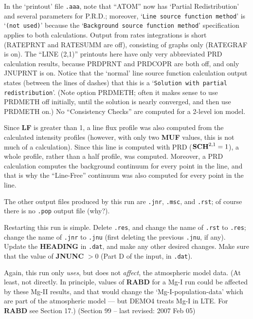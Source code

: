 In the `printout' file {\tt .aaa}, note that ``ATOM'' now has `Partial
Redistribution' and several parameters for P.R.D.; moreover,
`{\tt Line source function method}' is `{\tt (not used)}'
because the `{\tt Background source function method}' specification
applies to both calculations. Output from rates integrations is
short (RATEPRNT and RATESUMM are off), consisting of graphs only (RATEGRAF is
on). The ``LINE (2,1)'' printouts here have only very abbreviated PRD calculation
results, because PRDPRNT and PRDCOPR are both off, and only \break
JNUPRNT is on. Notice that the `normal' line source function calculation
output states (between the lines of dashes) that this is a `{\tt Solution with
partial redistribution}'. (Note option PRDMETH; often it makes sense to use
PRDMETH off initially, until the solution is nearly converged, and then
use PRDMETH on.) No ``Consistency Checks'' are computed
for a 2-level ion model. 

Since {\bf LF} is greater than 1, a line flux profile was also computed from
the calculated intensity profiles (however, with only two {\bf MUF} values,
this is not much of a calculation). Since this line is computed with PRD
(${\bf SCH}^{2,1} = 1$), a whole profile, rather than a half profile, was
computed. Moreover, a PRD calculation computes the background continuum for
every point in the line, and that is why the ``Line-Free'' continuum was also
computed for every point in the line.

The other output files produced by this run are {\tt .jnr}, {\tt .msc}, and
{\tt .rst}; of course there is no {\tt .pop} output file (why?).

Restarting this run is simple. Delete {\tt .res}, and change the name of
{\tt .rst} to {\tt .res}; change the name of {\tt .jnr} to {\tt .jnu} (first
deleting the previous {\tt .jnu}, if any). Update the {\bf HEADING} in
{\tt .dat}, and make any other desired changes. Make sure that the value
of {\bf JNUNC} $> 0$ (Part D of the input, in {\tt .dat}).

Again, this run only {\it uses}, but does not {\it affect},
the atmospheric model data. (At least, not directly. In principle, values
of {\bf RABD} for a Mg-I run could be affected by these Mg-II results, and that
would change the `Mg-I-population-data' which are part of the atmospheric
model --- but DEMO4 treats Mg-I in LTE. For {\bf RABD} see Section 17.)
\vfill
\noindent (Section 99 -- last revised: 2007 Feb 05) \par
{}
\ej
